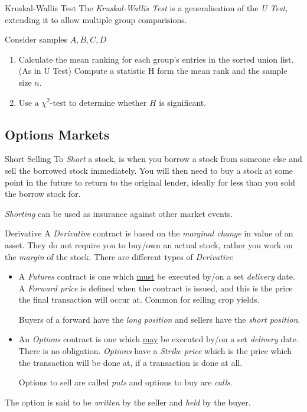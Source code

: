 \documentclass[11pt,a4paper]{article}
\begin{document}
\begin{definition}{Kruskal-Wallis Test}
  The \textit{Kruskal-Wallis Test} is a generalisation of the \textit{U Test}, extending it to allow multiple group comparisions.
  \par Consider samples $A,B,C,D$
  \begin{enumerate}
    \item Calculate the mean ranking for each group's entries in the sorted union list. (As in U Test)
    \itme Compute a statistic H form the mean rank and the sample size $n$.
    \item Use a $\chi^2$-test to determine whether $H$ is significant.
  \end{enumerate}
\end{definition}

\subsection{Options Markets}

\begin{definition}{Short Selling}
  To \textit{Short} a stock, is when you borrow a stock from someone else and sell the borrowed stock immediately. You will then need to buy a stock at some point in the future to return to the original lender, ideally for less than you sold the borrow stock for.
  \par \textit{Shorting} can be used as insurance against other market events.
\end{definition}

\begin{definition}{Derivative}
  A \textit{Derivative} contract is based on the \textit{marginal change} in value of an asset. They do not require you to buy/own an actual stock, rather you work on the \textit{margin} of the stock. There are different types of \textit{Derivative}
  \begin{itemize}
    \item A \textit{Futures} contract is one which \underline{must} be executed by/on a set \textit{delivery} date. A \textit{Forward price} is defined when the contract is issued, and this is the price the final transaction will occur at. Common for selling crop yields.
    \par Buyers of a forward have the \textit{long position} and sellers have the \textit{short position}.
    \item An \textit{Options} contract is one which \underline{may} be executed by/on a set \textit{delivery} date. There is no obligation. \textit{Options} have a \textit{Strike price} which is the price which the transaction will be done at, if a transaction is done at all.
    \par Options to sell are called \textit{puts} and options to buy are \textit{calls}.
  \end{itemize}
  The option is said to be \textit{written} by the seller and \textit{held} by the buyer.
\end{definition}
\end{document}
